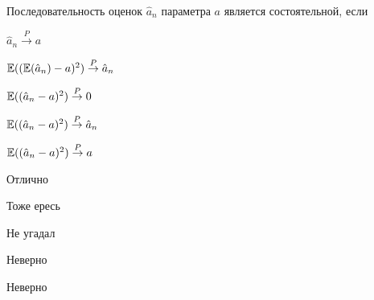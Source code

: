 
\begin{question}
Последовательность оценок \(\hat a_n\) параметра \(a\) является
состоятельной, если
\begin{answerlist}
  \item \(\hat a_n \stackrel{P}{\to} a\)
  \item \(\operatorname{\mathbb{E}}((\operatorname{\mathbb{E}}(\hat a_n) - a)^2) \stackrel{P}{\to} \hat a_n\)
  \item \(\operatorname{\mathbb{E}}((\hat a_n - a)^2) \stackrel{P}{\to} 0\)
  \item \(\operatorname{\mathbb{E}}((\hat a_n - a)^2) \stackrel{P}{\to} \hat a_n\)
  \item \(\operatorname{\mathbb{E}}((\hat a_n - a)^2) \stackrel{P}{\to} a\)
\end{answerlist}
\end{question}

\begin{solution}
\begin{answerlist}
  \item Отлично
  \item Тоже ересь
  \item Не угадал
  \item Неверно
  \item Неверно
\end{answerlist}
\end{solution}

